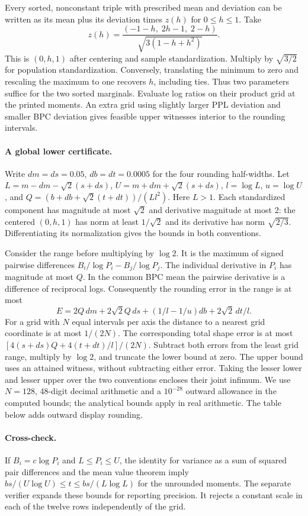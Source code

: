 \documentclass[11pt]{article}
\begin{document}
Every sorted, nonconstant triple with prescribed mean and deviation can be written as its mean plus its deviation times $z(h)$ for $0\le h\le1$. Take
\[
 z(h)=\frac{(-1-h,\;2h-1,\;2-h)}
                 {\sqrt{3(1-h+h^2)}} .
\]
This is $(0,h,1)$ after centering and sample standardization. Multiply by $\sqrt{3/2}$ for population standardization. Conversely, translating the minimum to zero and rescaling the maximum to one recovers $h$, including ties. Thus two parameters suffice for the two sorted marginals. Evaluate log ratios on their product grid at the printed moments. An extra grid using slightly larger PPL deviation and smaller BPC deviation gives feasible upper witnesses interior to the rounding intervals.

\paragraph{A global lower certificate.}
Write $dm=ds=0.05$, $db=dt=0.0005$ for the four rounding half-widths. Let $L=m-dm-\sqrt2(s+ds)$, $U=m+dm+\sqrt2(s+ds)$, $l=\log L$, $u=\log U$, and $Q=(b+db+\sqrt2(t+dt))/(Ll^2)$. Here $L>1$. Each standardized component has magnitude at most $\sqrt2$ and derivative magnitude at most 2: the centered $(0,h,1)$ has norm at least $1/\sqrt2$ and its derivative has norm $\sqrt{2/3}$. Differentiating its normalization gives the bounds in both conventions.

Consider the range before multiplying by $\log 2$. It is the maximum of signed pairwise differences $B_i/\log P_i-B_j/\log P_j$. The individual derivative in $P_i$ has magnitude at most $Q$. In the common BPC mean the pairwise derivative is a difference of reciprocal logs. Consequently the rounding error in the range is at most
\[
 E=2Q\,dm+2\sqrt2 Q\,ds+(1/l-1/u)db+2\sqrt2\,dt/l .
\]
For a grid with $N$ equal intervals per axis the distance to a nearest grid coordinate is at most $1/(2N)$. The corresponding total shape error is at most $[4(s+ds)Q+4(t+dt)/l]/(2N)$. Subtract both errors from the least grid range, multiply by $\log2$, and truncate the lower bound at zero. The upper bound uses an attained witness, without subtracting either error. Taking the lesser lower and lesser upper over the two conventions encloses their joint infimum. We use $N=128$, 48-digit decimal arithmetic and a $10^{-28}$ outward allowance in the computed bounds; the analytical bounds apply in real arithmetic. The table below adds outward display rounding.

\paragraph{Cross-check.} If $B_i=c\log P_i$ and $L\le P_i\le U$, the identity for variance as a sum of squared pair differences and the mean value theorem imply
$b s/(U\log U)\le t\le b s/(L\log L)$ for the unrounded moments. The separate verifier expands these bounds for reporting precision. It rejects a constant scale in each of the twelve rows independently of the grid.
\end{document}
